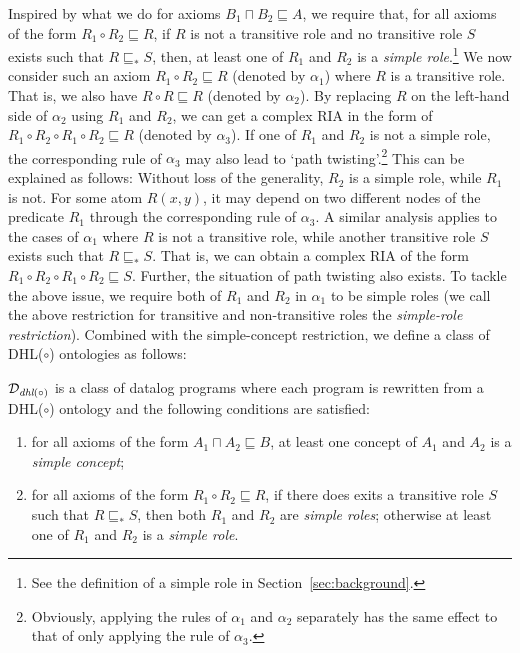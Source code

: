 Inspired by what we do for axioms $B_1\sqcap B_2\sqsubseteq A$,
we require that, for all axioms of the form $R_1\circ R_2\sqsubseteq R$,
if $R$ is not a transitive role and no transitive role $S$ exists such that $R\sqsubseteq_* S$,
then, at least one of $R_1$ and $R_2$ is
a \emph{simple role}.\footnote{See the definition of a simple role in Section~\ref{sec:background}.}
We now consider such an axiom $R_1\circ R_2\sqsubseteq R$ (denoted by $\alpha_1$) where $R$ is a transitive role.
That is, we also have $R\circ R\sqsubseteq R$ (denoted by $\alpha_2$).
By replacing $R$ on the left-hand side of $\alpha_2$ using $R_1$ and $R_2$,
we can get a complex RIA in the form of
$R_1\circ R_2\circ R_1\circ R_2\sqsubseteq R$ (denoted by $\alpha_3$).
If one of $R_1$ and $R_2$ is not a simple role, the corresponding
rule of $\alpha_3$ may also lead to `path twisting'.\footnote{Obviously, applying the rules of $\alpha_1$
and $\alpha_2$ separately has the same effect to that of only applying the rule of $\alpha_3$.}
This can be explained as follows: 
Without loss of the generality,
$R_2$ is a simple role, while $R_1$ is not.
For some atom $R(x,y)$, it may depend on two different nodes of the predicate $R_1$
through the corresponding rule of $\alpha_3$. A similar analysis applies to
the cases of $\alpha_1$ where $R$ is not a transitive role, while another transitive
role $S$ exists such that $R\sqsubseteq_* S$. That is, we can obtain
a complex RIA of the form $R_1\circ R_2\circ R_1\circ R_2\sqsubseteq S$.
Further, the situation of path twisting also exists.
To tackle the above issue,
we require both of $R_1$ and $R_2$ in $\alpha_1$ to be simple roles
(we call the above restriction for transitive and non-transitive roles
the \emph{simple-role restriction}).
Combined with the simple-concept restriction,
we define a class of DHL($\circ$) ontologies as follows:

\begin{definition}\label{def:dhlplus}
$\mathcal{D}_{\textit{\text{dhl}}(\circ)}$ is a class of datalog programs where each program
is rewritten from a DHL($\circ$) ontology and the following
conditions are satisfied:
\begin{enumerate}[leftmargin=4ex,label=\arabic*.]
\item for all axioms of the form $A_1\sqcap A_2\sqsubseteq B$,
    at least one concept of $A_1$ and $A_2$ is a \emph{simple concept};
\item for all axioms of the form $R_1\circ R_2\sqsubseteq R$,
    if there does exits a transitive role $S$ such that
    $R\sqsubseteq_* S$, then both $R_1$ and $R_2$ are \emph{simple
      roles}; otherwise at least one of $R_1$ and $R_2$ is a \emph{simple role}.
\end{enumerate}
\end{definition}

